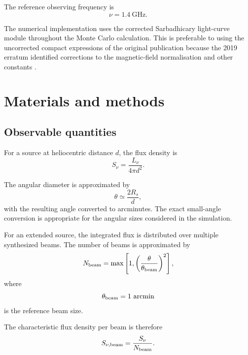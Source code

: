 \documentclass[
aps,
prd,
reprint,
superscriptaddress,
nofootinbib
]{revtex4-2}
\newcommand{\GHz}{\mathrm{GHz}}
\begin{document}
	The reference observing frequency is
	\begin{equation}
		\nu=1.4~\GHz.
	\end{equation}
	
	The numerical implementation uses the corrected Sarbadhicary light-curve
	module throughout the Monte Carlo calculation.  This is preferable to using
	the uncorrected compact expressions of the original publication because the
	2019 erratum identified corrections to the magnetic-field normalisation and
	other constants \cite{Sarbadhicary2019}.
	
	\section{Materials and methods}
	\label{sec:methods}
	
	\subsection{Observable quantities}
	
	For a source at heliocentric distance $d$, the flux density is
	\begin{equation}
		S_\nu=
		\frac{L_\nu}{4\pi d^2}.
		\label{eq:flux}
	\end{equation}
	
	The angular diameter is approximated by
	\begin{equation}
		\theta
		\simeq
		\frac{2R_s}{d},
		\label{eq:theta}
	\end{equation}
	with the resulting angle converted to arcminutes.  The exact small-angle
	conversion is appropriate for the angular sizes considered in the simulation.
	
	For an extended source, the integrated flux is distributed over multiple
	synthesized beams.  The number of beams is approximated by
	\begin{equation}
		N_{\rm beam}
		=
		\max\left[
		1,
		\left(
		\frac{\theta}{\theta_{\rm beam}}
		\right)^2
		\right],
		\label{eq:nbeam}
	\end{equation}
	where
	\begin{equation}
		\theta_{\rm beam}=1~{\rm arcmin}
	\end{equation}
	is the reference beam size.
	
	The characteristic flux density per beam is therefore
	\begin{equation}
		S_{\nu,\rm beam}
		=
		\frac{S_\nu}{N_{\rm beam}}.
		\label{eq:sbeam}
	\end{equation}
	
\end{document}
